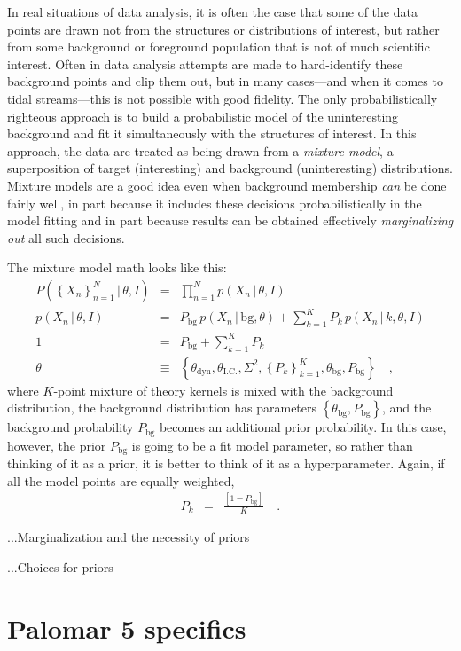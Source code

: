 \documentclass[12pt,pdftex,preprint]{aastex}
\newcommand{\setof}[1]{\left\{{#1}\right\}}
\newcommand{\given}{\,|\,}
\newcommand{\bg}{\mathrm{bg}}
\newcommand{\dyn}{\mathrm{dyn}}
\newcommand{\ic}{\mathrm{I.C.}}
\begin{document}
In real situations of data analysis, it is often the case that some of
the data points are drawn not from the structures or distributions of
interest, but rather from some background or foreground population
that is not of much scientific interest.  Often in data analysis
attempts are made to hard-identify these background points and clip
them out, but in many cases---and when it comes to tidal
streams---this is not possible with good fidelity.  The only
probabilistically righteous approach is to build a probabilistic model
of the uninteresting background and fit it simultaneously with the
structures of interest.  In this approach, the data are treated as
being drawn from a \emph{mixture model}, a superposition of target
(interesting) and background (uninteresting) distributions.  Mixture
models are a good idea even when background membership \emph{can} be
done fairly well, in part because it includes these decisions
probabilistically in the model fitting and in part because results can
be obtained effectively \emph{marginalizing out} all such decisions.

The mixture model math looks like this:
\begin{eqnarray}
P(\setof{X_n}_{n=1}^N\given\theta,I) &=& \prod_{n=1}^N p(X_n\given\theta,I)
\\
p(X_n\given\theta,I) &=& P_\bg\,p(X_n\given \bg,\theta) + \sum_{k=1}^K P_k\,p(X_n\given k,\theta,I)
\\
1 &=& P_\bg + \sum_{k=1}^K P_k
\\
\theta &\equiv& \setof{\theta_\dyn, \theta_\ic, \Sigma^2, \setof{P_k}_{k=1}^K, \theta_\bg, P_\bg}
\quad ,
\end{eqnarray}
where $K$-point mixture of theory kernels is mixed with the background
distribution, the background distribution has parameters
$\setof{\theta_\bg, P_\bg}$, and the background probability $P_\bg$
becomes an additional prior probability.  In this case, however, the
prior $P_\bg$ is going to be a fit model parameter, so rather than
thinking of it as a prior, it is better to think of it as a
hyperparameter.  Again, if all the model points are equally weighted,
\begin{eqnarray}
P_k &=& \frac{[1 - P_\bg]}{K}
\quad .
\end{eqnarray}

...Marginalization and the necessity of priors

...Choices for priors

\section{Palomar 5 specifics}
\end{document}
